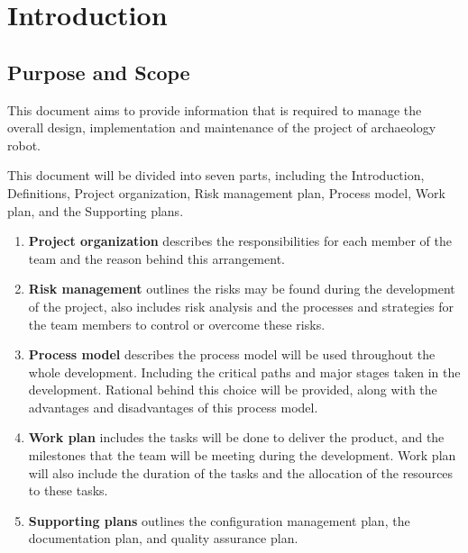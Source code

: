 \documentclass[11pt, a4paper]{report}
\begin{document}

\chapter{Introduction}

\section{Purpose and Scope}
This document aims to provide information that is required to manage the overall design, implementation and maintenance of the project of archaeology robot. 

This document will be divided into seven parts, including the Introduction, Definitions, Project organization, Risk management plan, Process model, Work plan, and the Supporting plans.

\begin{enumerate}
	\item \textbf{Project organization} describes the responsibilities for each member of the team and the reason behind this arrangement.
	\item \textbf{Risk management} outlines the risks may be found during the development of the project, also includes risk analysis and the processes and strategies for the team members to control or overcome these risks.
	\item \textbf{Process model} describes the process model will be used throughout the whole development. Including the critical paths and major stages taken in the development. Rational behind this choice will be provided, along with the advantages and disadvantages of this process model. 
	\item \textbf{Work plan} includes the tasks will be done to deliver the product, and the milestones that the team will be meeting during the development. Work plan will also include the duration of the tasks and the allocation of the resources to these tasks.
	\item \textbf{Supporting plans} outlines the configuration management plan, the documentation plan, and quality assurance plan.
\end{enumerate}
\end{document}
